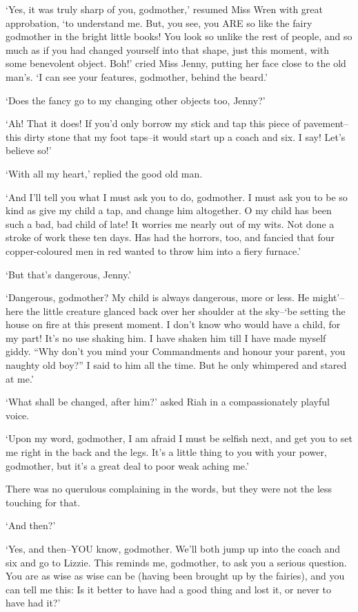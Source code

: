 ‘Yes, it was truly sharp of you, godmother,’ resumed Miss Wren with
great approbation, ‘to understand me. But, you see, you ARE so like the
fairy godmother in the bright little books! You look so unlike the rest
of people, and so much as if you had changed yourself into that shape,
just this moment, with some benevolent object. Boh!’ cried Miss Jenny,
putting her face close to the old man’s. ‘I can see your features,
godmother, behind the beard.’

‘Does the fancy go to my changing other objects too, Jenny?’

‘Ah! That it does! If you’d only borrow my stick and tap this piece of
pavement--this dirty stone that my foot taps--it would start up a coach
and six. I say! Let’s believe so!’

‘With all my heart,’ replied the good old man.

‘And I’ll tell you what I must ask you to do, godmother. I must ask you
to be so kind as give my child a tap, and change him altogether. O my
child has been such a bad, bad child of late! It worries me nearly
out of my wits. Not done a stroke of work these ten days. Has had the
horrors, too, and fancied that four copper-coloured men in red wanted to
throw him into a fiery furnace.’

‘But that’s dangerous, Jenny.’

‘Dangerous, godmother? My child is always dangerous, more or less. He
might’--here the little creature glanced back over her shoulder at the
sky--‘be setting the house on fire at this present moment. I don’t know
who would have a child, for my part! It’s no use shaking him. I have
shaken him till I have made myself giddy. “Why don’t you mind your
Commandments and honour your parent, you naughty old boy?” I said to him
all the time. But he only whimpered and stared at me.’

‘What shall be changed, after him?’ asked Riah in a compassionately
playful voice.

‘Upon my word, godmother, I am afraid I must be selfish next, and get
you to set me right in the back and the legs. It’s a little thing to you
with your power, godmother, but it’s a great deal to poor weak aching
me.’

There was no querulous complaining in the words, but they were not the
less touching for that.

‘And then?’

‘Yes, and then--YOU know, godmother. We’ll both jump up into the coach
and six and go to Lizzie. This reminds me, godmother, to ask you a
serious question. You are as wise as wise can be (having been brought
up by the fairies), and you can tell me this: Is it better to have had a
good thing and lost it, or never to have had it?’

